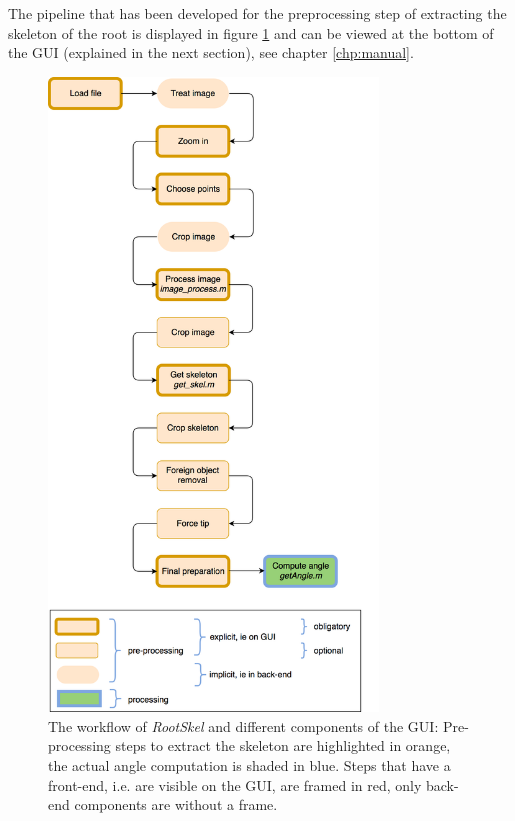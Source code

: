 The pipeline that has been developed for the preprocessing step of extracting the skeleton of the root is displayed in figure \ref{fig:workflow} and can be viewed at the bottom of the GUI (explained in the next section), see chapter \ref{chp:manual}.


\begin{figure}[H]
	\centering
	\includegraphics[width=0.78\textwidth]{../Figures/workflow_big.png}
	\caption{The workflow of \textit{RootSkel} and different components of the GUI: Pre-processing steps to extract the skeleton are highlighted in orange, the actual angle computation is shaded in blue. Steps that have a front-end, i.e. are visible on the GUI, are framed in red, only back-end components are without a frame. }
	\label{fig:workflow}
\end{figure}


